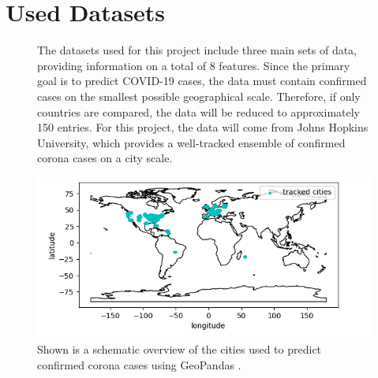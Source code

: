 \section{Used Datasets}
\begin{figure}
\begin{minipage}{0.4\textwidth}
    The datasets used for this project include three main sets of data, providing information on a total of 8 features. Since the primary goal is to predict COVID-19 cases, the data must contain confirmed cases on the smallest possible geographical scale. Therefore, if only countries are compared, the data will be reduced to approximately 150 entries. For this project, the data will come from Johns Hopkins University, which provides a well-tracked ensemble of confirmed corona cases on a city scale.
\end{minipage}
    \begin{minipage}{0.59\textwidth}
        \centering
        \captionsetup{width=0.9\linewidth}
        \includegraphics[width = 1\textwidth]{images/worldmap.png}
        \caption{Shown is a schematic overview of the cities used to predict confirmed corona cases using GeoPandas \cite{geopandas}.}
    \end{minipage}
\end{figure}
\noindent
